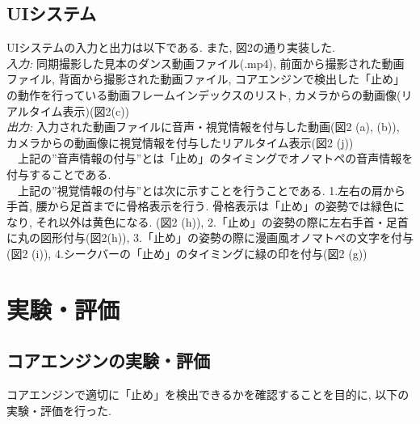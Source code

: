 \documentclass[paper]{ieicej}
\begin{document}
\subsection{UIシステム}
UIシステムの入力と出力は以下である. また, 図2の通り実装した. \\
\emph{入力: }同期撮影した見本のダンス動画ファイル(.mp4), 前面から撮影された動画ファイル, 背面から撮影された動画ファイル, コアエンジンで検出した「止め」の動作を行っている動画フレームインデックスのリスト, カメラからの動画像(リアルタイム表示)(図2(c))\\
\emph{出力: }入力された動画ファイルに音声・視覚情報を付与した動画(図2 (a), (b)), カメラからの動画像に視覚情報を付与したリアルタイム表示(図2 (j))\\
　上記の”音声情報の付与”とは「止め」のタイミングでオノマトペの音声情報を付与することである.\\
　上記の”視覚情報の付与”とは次に示すことを行うことである. 1.左右の肩から手首, 腰から足首までに骨格表示を行う. 骨格表示は「止め」の姿勢では緑色になり, それ以外は黄色になる. (図2 (h)), 2.「止め」の姿勢の際に左右手首・足首に丸の図形付与(図2(h)), 3.「止め」の姿勢の際に漫画風オノマトペの文字を付与(図2 (i)), 4.シークバーの「止め」のタイミングに緑の印を付与(図2 (g))
\section{実験・評価}
\subsection{コアエンジンの実験・評価}
コアエンジンで適切に「止め」を検出できるかを確認することを目的に, 以下の実験・評価を行った. 
\end{document}
